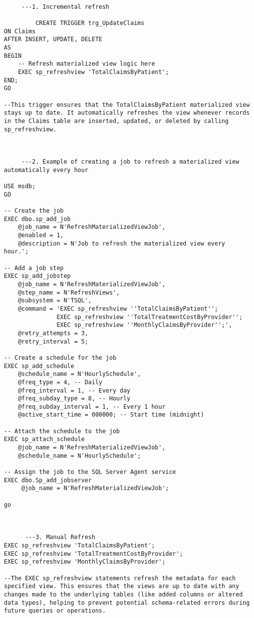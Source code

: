          \begin{lstlisting}[style=sqlstyle]

     ---1. Incremental refresh 
     
         CREATE TRIGGER trg_UpdateClaims
ON Claims
AFTER INSERT, UPDATE, DELETE
AS
BEGIN
    -- Refresh materialized view logic here
    EXEC sp_refreshview 'TotalClaimsByPatient';
END;
GO

--This trigger ensures that the TotalClaimsByPatient materialized view stays up to date. It automatically refreshes the view whenever records in the Claims table are inserted, updated, or deleted by calling sp_refreshview.



     ---2. Example of creating a job to refresh a materialized view automatically every hour

USE msdb;
GO

-- Create the job
EXEC dbo.sp_add_job
    @job_name = N'RefreshMaterializedViewJob',
    @enabled = 1,
    @description = N'Job to refresh the materialized view every hour.';

-- Add a job step
EXEC sp_add_jobstep
    @job_name = N'RefreshMaterializedViewJob',
    @step_name = N'RefreshViews',
    @subsystem = N'TSQL',
    @command = 'EXEC sp_refreshview ''TotalClaimsByPatient'';
               EXEC sp_refreshview ''TotalTreatmentCostByProvider'';
               EXEC sp_refreshview ''MonthlyClaimsByProvider'';',
    @retry_attempts = 3,
    @retry_interval = 5;

-- Create a schedule for the job
EXEC sp_add_schedule
    @schedule_name = N'HourlySchedule',
    @freq_type = 4, -- Daily
    @freq_interval = 1, -- Every day
    @freq_subday_type = 8, -- Hourly
    @freq_subday_interval = 1, -- Every 1 hour
    @active_start_time = 000000; -- Start time (midnight)

-- Attach the schedule to the job
EXEC sp_attach_schedule
    @job_name = N'RefreshMaterializedViewJob',
    @schedule_name = N'HourlySchedule';

-- Assign the job to the SQL Server Agent service
EXEC dbo.Sp_add_jobserver
     @job_name = N'RefreshMaterializedViewJob';

go 



      ---3. Manual Refresh
EXEC sp_refreshview 'TotalClaimsByPatient';
EXEC sp_refreshview 'TotalTreatmentCostByProvider';
EXEC sp_refreshview 'MonthlyClaimsByProvider';

--The EXEC sp_refreshview statements refresh the metadata for each specified view. This ensures that the views are up to date with any changes made to the underlying tables (like added columns or altered data types), helping to prevent potential schema-related errors during future queries or operations.
        \end{lstlisting}